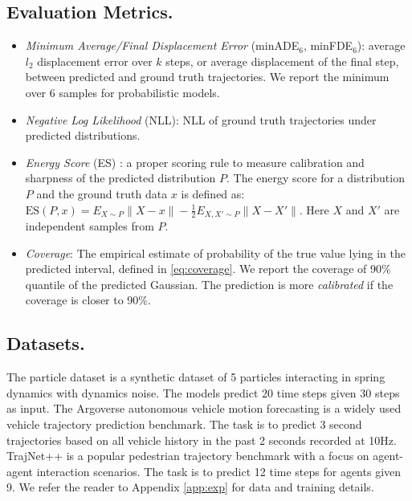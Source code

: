 \subsection{Evaluation Metrics.}
\begin{itemize}%
\itemsep0em 
\item \textit{Minimum Average/Final Displacement Error} (minADE$_6$, minFDE$_6$):  average $l_2$ displacement error over $k$ steps, or average displacement of the final step, between predicted and ground truth trajectories. We report the minimum over 6 samples for probabilistic models. 
\item \textit{Negative Log Likelihood} (NLL): NLL of ground truth trajectories under predicted distributions.
\item \textit{Energy Score} (ES) \cite{properscoring}: a proper scoring rule to measure calibration and sharpness of the predicted distribution $P$. The energy score for a distribution $P$ and the ground truth data $x$ is defined as: $\text{ES}(P, x) = E_{X \sim P} \| X - x \| - \frac{1}{2} E_{ X, X' \sim P} \| X - X' \| $. Here $X$ and $X'$ are independent samples from $P$. 
\item \textit{Coverage}: The empirical estimate of probability of the true value lying in the predicted interval, defined in  \eqref{eq:coverage}. We report the coverage of 90\% quantile of the predicted Gaussian. The  prediction is more \textit{calibrated} if the coverage is closer to 90\%.
\end{itemize}

\subsection{Datasets.}
The particle dataset is a synthetic dataset of 5 particles interacting in spring dynamics \cite{nri} with dynamics noise. The models predict 20 time steps given 30 steps as input.
The Argoverse autonomous vehicle motion forecasting \cite{argoverse} is a widely used vehicle trajectory prediction benchmark. The task is to predict 3 second trajectories based on all vehicle history in the past 2 seconds recorded at 10Hz. 
%
TrajNet++ \cite{pedestriandata} is a popular pedestrian trajectory benchmark with a focus on agent-agent interaction scenarios. The task is to predict 12 time steps for agents given 9. We refer the reader to Appendix \ref{app:exp} for data and training details. 

